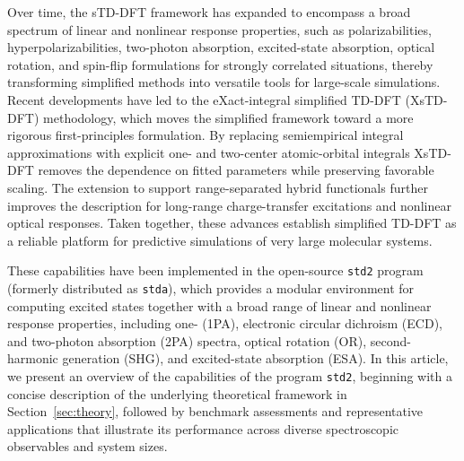 \documentclass[%
 aip,
 amsmath,amssymb,
preprint,%
]{revtex4-2}
\begin{document}
Over time, the sTD-DFT framework has expanded to encompass a broad spectrum of linear and nonlinear response properties,\cite{dewergifossePerspectiveSimplifiedQuantum2021} such as polarizabilities, hyperpolarizabilities,\cite{dewergifosseNonlinearresponsePropertiesSimplified2018} two-photon absor\-ption,\cite{dewergifosseUltrafastEvaluationTwoPhoton2022} excited-state absorption,\cite{dewergifosseNonlinearresponsePropertiesSimplified2019} optical rotation,\cite{dewergifosseSimplifiedTimedependentDensity2020} and spin-flip formulations for strongly correlated situations,\cite{dewergifosseSimplifiedSpinFlipTimeDependent2019}  thereby transforming simplified methods into versatile tools for large-scale simulations.  
Recent developments have led to the eXact-integral simplified TD-DFT (XsTD-DFT) methodology,\cite{dewergifosseEXactIntegralSimplified2024} which moves the simplified framework toward a more rigorous first-principles formulation.  
By replacing semiempirical integral approximations with explicit  one- and two-center atomic-orbital integrals  XsTD-DFT removes the dependence on fitted parameters while preserving favorable scaling.  
The extension to support range-separated hybrid functionals\cite{dewergifosseComputingExcitedStates2024} further improves the description for long-range charge-transfer excitations and nonlinear optical responses.  
Taken together, these advances establish simplified TD-DFT as a reliable platform for predictive simulations of very large molecular systems.  

These capabilities have been implemented in the open-source \texttt{std2} program\cite{std2zenodo} (formerly distributed as \texttt{stda}), which provides a modular environment for computing excited states together with a broad range of linear and nonlinear response properties, including one- (1PA), electronic circular dichroism (ECD), and two-photon absorption (2PA) spectra, optical rotation (OR), second-harmonic generation (SHG), and excited-state absorption (ESA).  
In this article, we present an overview of the capabilities of the program \texttt{std2}, beginning with a concise description of the underlying theoretical framework in Section~\ref{sec:theory}, followed by benchmark assessments and representative applications that illustrate its performance across diverse spectroscopic observables and system sizes.  
\end{document}
